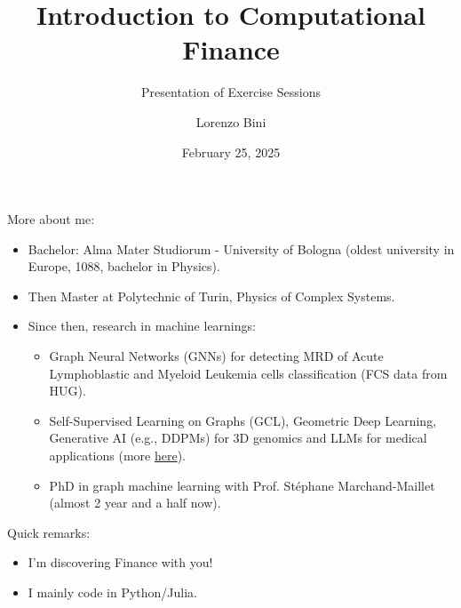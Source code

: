 \documentclass[handout]{beamer}
\title{Introduction to Computational Finance}
\subtitle{Presentation of Exercise Sessions}
\author{Lorenzo Bini}
\institute{University of Geneva}
\date{February 25, 2025}
\begin{document}
\begin{frame}
\titlepage
\end{frame}

\begin{frame}
    More about me: \pause
    \begin{itemize}
        \item Bachelor: Alma Mater Studiorum - University of Bologna (oldest university in Europe, 1088, bachelor in Physics). \pause
        \item Then Master at Polytechnic of Turin, Physics of Complex Systems. \pause
        \item Since then, research in machine learnings: \pause
        \begin{itemize}
            \item Graph Neural Networks (GNNs) for detecting MRD of Acute Lymphoblastic and Myeloid Leukemia cells classification (FCS data from HUG). \pause
            \item Self-Supervised Learning on Graphs (GCL), Geometric Deep Learning, Generative AI  (e.g., DDPMs) for 3D genomics and LLMs for medical applications (more \href{https://lorenzobini4.github.io/}{here}). \pause
            \item PhD in graph machine learning with Prof. Stéphane Marchand-Maillet (almost 2 year and a half now). \pause
        \end{itemize}
    \end{itemize}
    \vspace{1cm}
    Quick remarks: \pause
    \begin{itemize}
        \item I'm discovering Finance with you! \pause
        \item I mainly code in Python/Julia.
    \end{itemize}
\end{frame}
\end{document}
